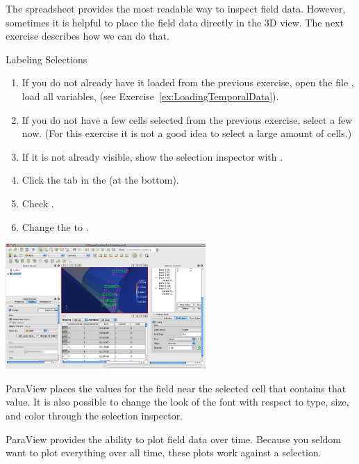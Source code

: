 The spreadsheet provides the most readable way to inspect field data.
However, sometimes it is helpful to place the field data directly in the 3D
view.  The next exercise describes how we can do that.

\begin{exercise}{Labeling Selections}
  \label{ex:LabelingSelections}%
  \begin{enumerate}
  \item If you do not already have it loaded from the previous exercise,
    open the file , load all variables, \apply (see
    Exercise~\ref{ex:LoadingTemporalData}).
  \item If you do not have a few cells selected from the previous exercise,
    select a few now. (For this exercise it is not a good idea to select a
    large amount of cells.)
  \item If it is not already visible, show the selection inspector
    with  \ra {}.
  \item Click the  tab in the  (at
    the bottom).
  \item Check .
  \item Change the  to .
  \end{enumerate}

  \begin{inlinefig}
    \includegraphics[width=3in]{images/SpreadsheetSelection}
  \end{inlinefig}

  ParaView places the values for the  field near the selected
  cell that contains that value.  It is also possible to change the look of
  the font with respect to type, size, and color through the selection
  inspector.
\end{exercise}

ParaView provides the ability to plot field data over time.  Because you
seldom want to plot everything over all time, these plots work against a
selection.


